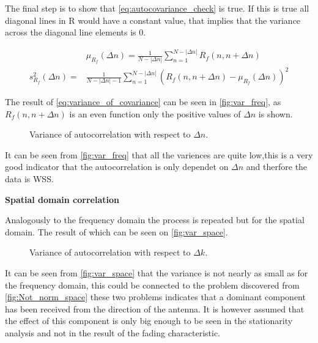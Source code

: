 The final step is to show that \autoref{eq:autocovariance_check} is true. If this is true all diagonal lines in R would have a constant value, that implies that the variance across the diagonal line elements is 0. 

\begin{align}
&\mu_{R_f}(\Delta n) = \frac{1}{N-|\Delta n|}\sum_{n = 1}^{N-|\Delta n|} R_f(n,n+\Delta n) \label{EQcor}\\
s_{R_f}^2(\Delta n) = &\frac{1}{N-|\Delta n|-1}\sum_{n = 1}^{N-|\Delta n|} \left( R_f(n,n+\Delta n) - \mu_{R_f}(\Delta n) \right)^2 \label{eq:variance_of_covariance}
\end{align}
\begin{where}
\end{where}

The result of \autoref{eq:variance_of_covariance} can be seen in \autoref{fig:var_freq}, as $R_f(n,n+\Delta n)$ is an even function only the positive values of $\Delta n$ is shown.

\begin{figure}[H]
\centering

\caption{Variance of autocorrelation with respect to $\Delta n$.}
\label{fig:var_freq}
\end{figure}

It can be seen from \autoref{fig:var_freq} that all the variences are quite low,this is a very good indicator that the autocorrelation is only dependet on $\Delta n$ and therfore the data is WSS.

\textbf{Spatial domain correlation}

Analogously to the frequency domain the process is repeated but for the spatial domain. The result of which can be seen on \autoref{fig:var_space}.

\begin{figure}[H]
\centering

\caption{Variance of autocorrelation with respect to $\Delta k$.}
\label{fig:var_space}
\end{figure}

It can be seen from \autoref{fig:var_space} that the variance is not nearly as small as for the frequency domain, this could be connected to the problem discovered from \autoref{fig:Not_norm_space} these two problems indicates that a dominant component has been received from the direction of the antenna. It is however assumed that the effect of this component is only big enough to be seen in the stationarity analysis and not in the result of the fading characteristic.
